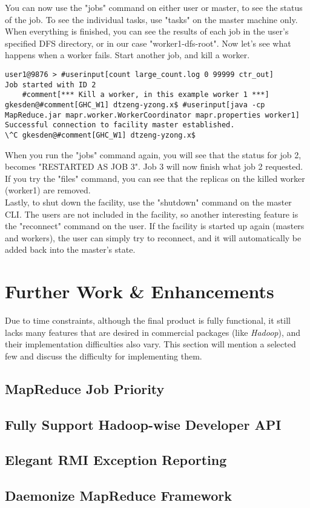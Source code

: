 \documentclass{article} %
\begin{document}
You can now use the "jobs" command on either user or master, to see the status of the job.  To see the individual tasks, use "tasks" on the master machine only.  When everything is finished, you can see the results of each job in the user's specified DFS directory, or in our case "worker1-dfs-root".  Now let's see what happens when a worker fails.  Start another job, and kill a worker.
\begin{Verbatim}[fontsize=\small, xleftmargin=-.5in,commandchars=\#\[\]]
user1@9876 > #userinput[count large_count.log 0 99999 ctr_out]
Job started with ID 2
	#comment[*** Kill a worker, in this example worker 1 ***]
gkesden@#comment[GHC_W1] dtzeng-yzong.x$ #userinput[java -cp MapReduce.jar mapr.worker.WorkerCoordinator mapr.properties worker1]
Successful connection to facility master established.
\^C gkesden@#comment[GHC_W1] dtzeng-yzong.x$
\end{Verbatim}
When you run the "jobs" command again, you will see that the status for job 2, becomes "RESTARTED AS JOB 3".  Job 3 will now finish what job 2 requested.  If you try the "files" command, you can see that the replicas on the killed worker (worker1) are removed.\\
Lastly, to shut down the facility, use the "shutdown" command on the master CLI.  The users are not included in the facility, so another interesting feature is the "reconnect" command on the user.  If the facility is started up again (masters and workers), the user can simply try to reconnect, and it will automatically be added back into the master's state.

\section{Further Work \& Enhancements}

Due to time constraints, although the final product is fully functional, it still lacks many features that are desired in commercial packages (like \emph{Hadoop}), and their implementation difficulties also vary. This section will mention a selected few and discuss the difficulty for implementing them.

\subsection{MapReduce Job Priority}


\subsection{Fully Support Hadoop-wise Developer API}


\subsection{Elegant RMI Exception Reporting}


\subsection{Daemonize MapReduce Framework}

\end{document}
